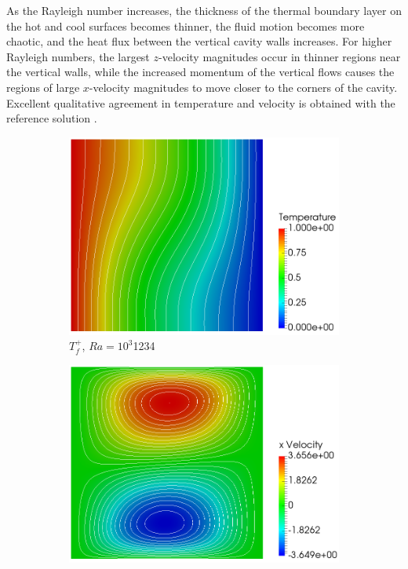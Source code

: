 As the Rayleigh number increases, the thickness of the thermal boundary layer on the hot and cool surfaces becomes thinner, the fluid motion becomes more chaotic, and the heat flux between the vertical cavity walls increases. For higher Rayleigh numbers, the largest \(z\)-velocity magnitudes occur in thinner regions near the vertical walls, while the increased momentum of the vertical flows causes the regions of large \(x\)-velocity magnitudes to move closer to the corners of the cavity. Excellent qualitative agreement in temperature and velocity is obtained with the reference solution \cite{davis_1983}.

\begin{figure}[!h]
\centering
\begin{subfigure}{0.32\textwidth}
  \centering
  \includegraphics[width=\linewidth]{figs/Ra3_t.png}
  \caption{\(T_f^+\), \(Ra=10^3\)\color{white}1234}
    \vspace*{0.5em}
\end{subfigure}
\begin{subfigure}{0.32\textwidth}
  \centering
  \includegraphics[width=\linewidth]{figs/Ra3_u.png}

\end{subfigure}
\end{figure}
